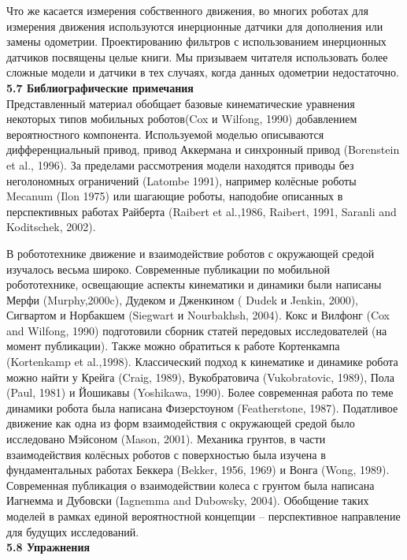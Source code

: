 \documentclass[10pt,a4paper]{article}
\begin{document}
Что же касается измерения собственного движения, во многих роботах для измерения движения используются инерционные датчики для дополнения или замены одометрии. Проектированию фильтров с использованием инерционных датчиков посвящены целые книги. Мы призываем читателя использовать более сложные модели и датчики в тех случаях, когда данных одометрии недостаточно.\\

\textbf{5.7 Библиографические примечания}\\

Представленный материал обобщает базовые кинематические уравнения некоторых типов мобильных роботов(Cox и Wilfong, 1990) добавлением вероятностного компонента. Используемой моделью описываются дифференциальный привод, привод Аккермана и синхронный привод (Borenstein et al., 1996). За пределами рассмотрения модели находятся приводы без неголономных ограничений (Latombe 1991), например колёсные роботы Mecanum (Ilon 1975) или шагающие роботы, наподобие описанных в перспективных работах Райберта (Raibert et al.,1986, Raibert, 1991, Saranli and Koditschek, 2002).

В робототехнике движение и взаимодействие роботов с окружающей средой изучалось весьма широко. Современные публикации по мобильной робототехнике, освещающие аспекты кинематики и динамики были написаны Мерфи (Murphy,2000c), Дудеком и Дженкином ( Dudek и Jenkin, 2000), Сигвартом и Норбакшем (Siegwart и Nourbakhsh, 2004).
Кокс и Вилфонг (Cox and Wilfong, 1990) подготовили сборник статей передовых исследователей (на момент публикации). Также можно обратиться к работе Кортенкампа (Kortenkamp et al.,1998). Классический подход к кинематике и динамике робота можно найти у Крейга (Craig, 1989), Вукобратовича (Vukobratovic, 1989), Пола (Paul, 1981) и Йошикавы (Yoshikawa, 1990).
Более современная работа по теме динамики робота была написана Физерстоуном (Featherstone, 1987). Податливое движение как одна из форм взаимодействия с окружающей средой было исследовано Мэйсоном (Mason, 2001). Механика грунтов, в части взаимодействия колёсных роботов с поверхностью была изучена в фундаментальных работах Беккера (Bekker, 1956, 1969) и Вонга (Wong, 1989). Современная публикация о взаимодействии колеса с грунтом была написана Иагнемма и Дубовски (Iagnemma and Dubowsky, 2004). Обобщение таких моделей в рамках единой вероятностной концепции – перспективное направление для будущих исследований. \\

\textbf{5.8 Упражнения}\\
\end{document}
